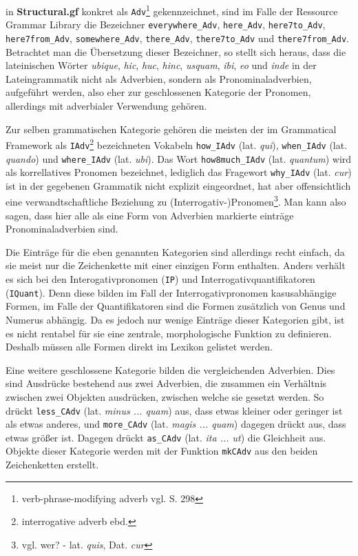 in \textbf{Structural.gf} konkret als \texttt{Adv}\footnote{verb-phrase-modifying adverb vgl. \cite{RANTA2011} S. 298} gekennzeichnet, sind im Falle der Ressource Grammar Library die Bezeichner \texttt{everywhere\_Adv}, \texttt{here\_Adv}, \texttt{here7to\_Adv}, \texttt{here7from\_Adv}, \texttt{somewhere\_Adv}, \texttt{there\_Adv}, \texttt{there7to\_Adv} und \texttt{there7from\_Adv}. Betrachtet man die Übersetzung dieser Bezeichner, so stellt sich heraus, dass die lateinischen Wörter \textit{ubique}, \textit{hic}, \textit{huc}, \textit{hinc}, \textit{usquam}, \textit{ibi}, \textit{eo} und \textit{inde} in der Lateingrammatik nicht als Adverbien, sondern als Pronominaladverbien, aufgeführt werden, also eher zur geschlossenen Kategorie der Pronomen, allerdings mit adverbialer Verwendung gehören. \par
Zur selben grammatischen Kategorie gehören die meisten der im Grammatical Framework als \texttt{IAdv}\footnote{interrogative adverb ebd.} bezeichneten Vokabeln \texttt{how\_IAdv} (lat. \textit{qui}), \texttt{when\_IAdv} (lat. \textit{quando}) und \texttt{where\_IAdv} (lat. \textit{ubi}). Das Wort \texttt{how8much\_IAdv} (lat. \textit{quantum}) wird als korrellatives Pronomen bezeichnet, lediglich das Fragewort \texttt{why\_IAdv} (lat. \textit{cur}) ist in der gegebenen Grammatik nicht explizit eingeordnet, hat aber offensichtlich eine verwandtschaftliche Beziehung zu (Interrogativ-)Pronomen\footnote {vgl. wer? -  lat. \textit{quis}, Dat. \textit{cur}}. Man kann also sagen, dass hier alle als eine Form von Adverbien markierte einträge Pronominaladverbien sind.\par
Die Einträge für die eben genannten Kategorien sind allerdings recht einfach, da sie meist nur die Zeichenkette mit einer einzigen Form enthalten. Anders verhält es sich bei den Interogativpronomen (\texttt{IP}) und Interrogativquantifikatoren (\texttt{IQuant}). Denn diese bilden im Fall der Interrogativpronomen kasusabhängige Formen, im Falle der Quantifikatoren sind die Formen zusätzlich von Genus und Numerus abhängig. Da es jedoch nur wenige Einträge dieser Kategorien gibt, ist es nicht rentabel für sie eine zentrale, morphologische Funktion zu definieren. Deshalb müssen alle Formen direkt im Lexikon gelistet werden. \par
Eine weitere geschlossene Kategorie bilden die vergleichenden Adverbien. Dies sind Ausdrücke bestehend aus zwei Adverbien, die zusammen ein Verhältnis zwischen zwei Objekten ausdrücken, zwischen welche sie gesetzt werden. So drückt \texttt{less\_CAdv} (lat. \textit{minus ... quam}) aus, dass etwas kleiner oder geringer ist als etwas anderes, und \texttt{more\_CAdv} (lat. \textit{magis ... quam}) dagegen drückt aus, dass etwas größer ist. Dagegen drückt \texttt{as\_CAdv} (lat. \textit{ita ... ut}) die Gleichheit aus. Objekte dieser Kategorie werden mit der Funktion \texttt{mkCAdv} aus den beiden Zeichenketten erstellt. \par
